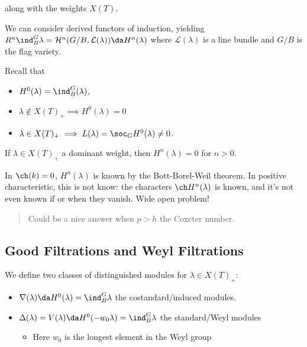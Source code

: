 \begin{center}\end{center}

along with the weights \(X(T)\).

We can consider derived functors of induction, yielding
\(R^n \ind_B^G \lambda = \mathcal{H}^n(G/B, \mathcal{L}(\lambda)) \da H^n(\lambda)\)
where \(\mathcal{L}(\lambda)\) is a line bundle and \(G/B\) is the flag
variety.

Recall that

\begin{itemize}
\tightlist
\item
  \(H^0(\lambda) = \ind_B^G(\lambda)\),
\item
  \(\lambda \not\in X(T)_+ \implies H^0(\lambda) = 0\)
\item
  \(\lambda \in X(T)_+ \implies L(\lambda) = \soc_G H^0(\lambda) \neq 0\).
\end{itemize}

\begin{theorem}[Kempf]

If \(\lambda \in X(T)_+\) a dominant weight, then \(H^n(\lambda) = 0\)
for \(n> 0\).

\end{theorem}

\begin{remark}

In \(\ch(k) = 0\), \(H^n(\lambda)\) is known by the Bott-Borel-Weil
theorem. In positive characteristic, this is not know: the characters
\(\ch H^n (\lambda)\) is known, and it's not even known if or when they
vanish. Wide open problem!

\begin{quote}
Could be a nice answer when \(p>h\) the Coxeter number.
\end{quote}

\end{remark}

\hypertarget{good-filtrations-and-weyl-filtrations}{%
\subsection{Good Filtrations and Weyl
Filtrations}\label{good-filtrations-and-weyl-filtrations}}

We define two classes of distinguished modules for
\(\lambda \in X(T)_+\):

\begin{itemize}
\tightlist
\item
  \(\nabla(\lambda) \da H^0(\lambda) = \ind_B^G \lambda\) the
  costandard/induced modules.
\item
  \(\Delta(\lambda) = V(\lambda) \da H^0(-w_0 \lambda) = \ind_B^G \lambda\)
  the standard/Weyl modules

  \begin{itemize}
  \tightlist
  \item
    Here \(w_0\) is the longest element in the Weyl group
  \end{itemize}
\end{itemize}

